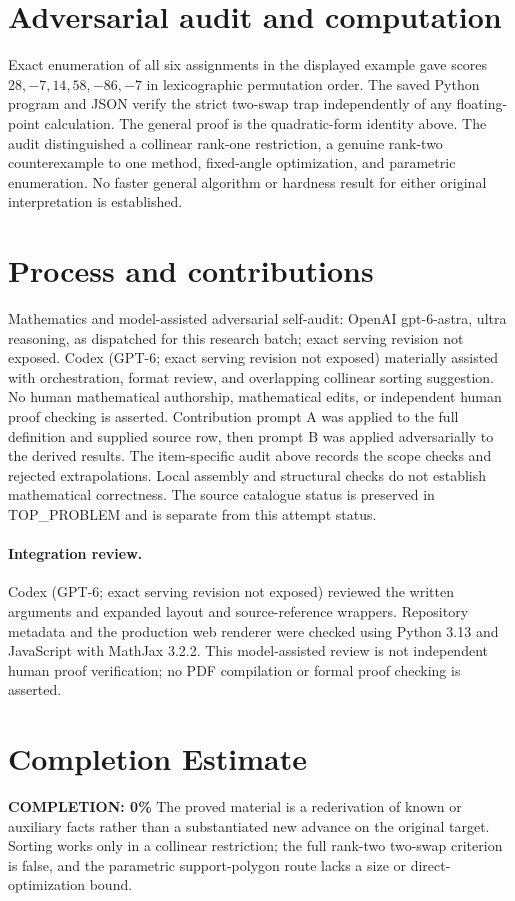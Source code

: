 \documentclass[11pt]{article}
\begin{document}
\section{Adversarial audit and computation}
Exact enumeration of all six assignments in the displayed example gave
scores $28,-7,14,58,-86,-7$ in lexicographic permutation order. The saved
Python program and JSON verify the strict two-swap trap independently of
any floating-point calculation. The general proof is the quadratic-form
identity above. The audit distinguished a collinear rank-one restriction,
a genuine rank-two counterexample to one method, fixed-angle optimization,
and parametric enumeration. No faster general algorithm or hardness result
for either original interpretation is established.

\section{Process and contributions}
Mathematics and model-assisted adversarial self-audit: OpenAI gpt-6-astra, ultra reasoning, as dispatched for this research batch; exact serving revision not exposed. Codex (GPT-6; exact serving revision not exposed) materially assisted with orchestration, format review, and overlapping collinear sorting suggestion. No human mathematical authorship, mathematical edits, or independent human proof checking is asserted.
Contribution prompt A was applied to the full definition and supplied source row, then prompt B was applied adversarially to the derived results. The item-specific audit above records the scope checks and rejected extrapolations. Local assembly and structural checks do not establish mathematical correctness. The source catalogue status is preserved in TOP\_PROBLEM and is separate from this attempt status.
\paragraph{Integration review.} Codex (GPT-6; exact serving revision not exposed) reviewed the written arguments and expanded layout and source-reference wrappers. Repository metadata and the production web renderer were checked using Python 3.13 and JavaScript with MathJax 3.2.2. This model-assisted review is not independent human proof verification; no PDF compilation or formal proof checking is asserted.

\section{Completion Estimate}
\noindent\textbf{COMPLETION: 0\%}
The proved material is a rederivation of known or auxiliary facts rather than a substantiated new advance on the original target. Sorting works only in a collinear restriction; the full rank-two two-swap criterion is false, and the parametric support-polygon route lacks a size or direct-optimization bound.
\end{document}
